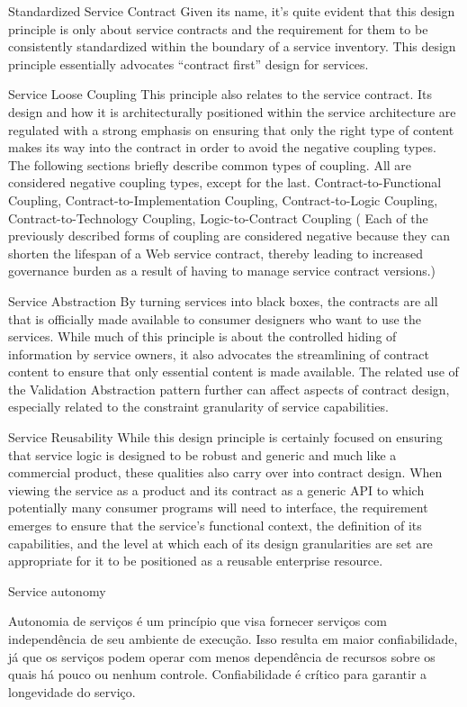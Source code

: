Standardized Service Contract
Given its name, it’s quite evident that this design principle is only about service contracts
and the requirement for them to be consistently standardized within the boundary
of a service inventory. This design principle essentially advocates “contract first”
design for services.

Service Loose Coupling
This principle also relates to the service contract. Its design and how it is architecturally
positioned within the service architecture are regulated with a strong emphasis on
ensuring that only the right type of content makes its way into the contract in order to
avoid the negative coupling types.
The following sections briefly describe common types of coupling. All are considered
negative coupling types, except for the last.
Contract-to-Functional Coupling, Contract-to-Implementation Coupling,
Contract-to-Logic Coupling, Contract-to-Technology Coupling, 
Logic-to-Contract Coupling (
Each of the previously described forms of coupling are considered negative because
they can shorten the lifespan of a Web service contract, thereby leading to increased governance
burden as a result of having to manage service contract versions.)

Service Abstraction
By turning services into black boxes, the contracts are all that is officially made available
to consumer designers who want to use the services. While much of this principle is
about the controlled hiding of information by service owners, it also advocates the
streamlining of contract content to ensure that only essential content is made available.
The related use of the Validation Abstraction pattern further can affect aspects of contract
design, especially related to the constraint granularity of service capabilities.

Service Reusability
While this design principle is certainly focused on ensuring that service logic is designed
to be robust and generic and much like a commercial product, these qualities also carry
over into contract design. When viewing the service as a product and its contract as a
generic API to which potentially many consumer programs will need to interface, the
requirement emerges to ensure that the service’s functional context, the definition of its
capabilities, and the level at which each of its design granularities are set are appropriate
for it to be positioned as a reusable enterprise resource.

Service autonomy

Autonomia de serviços é um princípio que visa fornecer serviços com
independência de seu ambiente de execução. Isso resulta em maior confiabilidade, já que os serviços podem operar com menos dependência de recursos sobre os quais há pouco ou nenhum controle. Confiabilidade é crítico para garantir a longevidade do serviço. 



